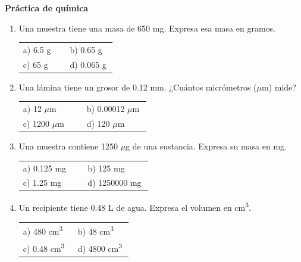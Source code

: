 \documentclass[11pt,a4paper]{article}
\begin{document}
{\Large\bfseries Práctica de química}
\vspace{12pt}
\begin{enumerate}[label=\textbf{\arabic*.},leftmargin=*,itemsep=16pt,topsep=0pt]
\item \begin{minipage}[t]{\linewidth}
Una muestra tiene una masa de 650 mg. Expresa esa masa en gramos.

\vspace{7pt}
\begin{tabular}{@{}p{0.48\linewidth}p{0.48\linewidth}@{}}
a) 6.5 g & b) 0.65 g \\[5pt]
c) 65 g & d) 0.065 g \\
\end{tabular}
\end{minipage}

\item \begin{minipage}[t]{\linewidth}
Una lámina tiene un grosor de 0.12 mm. ¿Cuántos micrómetros (\(\mu\)m) mide?

\vspace{7pt}
\begin{tabular}{@{}p{0.48\linewidth}p{0.48\linewidth}@{}}
a) 12 \(\mu\)m & b) 0.00012 \(\mu\)m \\[5pt]
c) 1200 \(\mu\)m & d) 120 \(\mu\)m \\
\end{tabular}
\end{minipage}

\item \begin{minipage}[t]{\linewidth}
Una muestra contiene 1250 \(\mu\)g de una sustancia. Expresa su masa en mg.

\vspace{7pt}
\begin{tabular}{@{}p{0.48\linewidth}p{0.48\linewidth}@{}}
a) 0.125 mg & b) 125 mg \\[5pt]
c) 1.25 mg & d) 1250000 mg \\
\end{tabular}
\end{minipage}

\item \begin{minipage}[t]{\linewidth}
Un recipiente tiene 0.48 L de agua. Expresa el volumen en cm\textsuperscript{3}.

\vspace{7pt}
\begin{tabular}{@{}p{0.48\linewidth}p{0.48\linewidth}@{}}
a) 480 cm\textsuperscript{3} & b) 48 cm\textsuperscript{3} \\[5pt]
c) 0.48 cm\textsuperscript{3} & d) 4800 cm\textsuperscript{3} \\
\end{tabular}
\end{minipage}


\end{enumerate}
\end{document}
